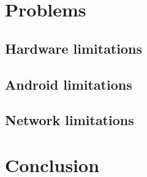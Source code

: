 \chapter{Problems}

\section{Hardware limitations}

\section{Android limitations}

\section{Network limitations}

\chapter{Conclusion}
